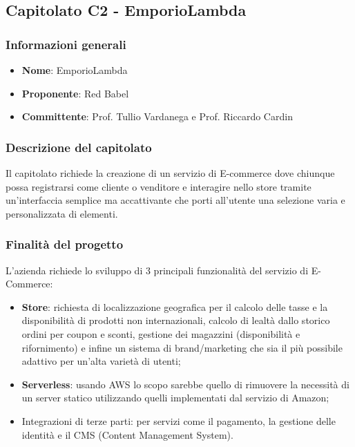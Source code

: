 	\subsection{Capitolato C2 - EmporioLambda}
		\subsubsection{Informazioni generali}
			\begin{itemize}
				\item\textbf{Nome}: EmporioLambda
				\item\textbf{Proponente}: Red Babel
				\item\textbf{Committente}: Prof. Tullio Vardanega e Prof. Riccardo Cardin
			\end{itemize}
			
		\subsubsection{Descrizione del capitolato}
			Il capitolato richiede la creazione di un servizio di E-commerce dove chiunque possa registrarsi come cliente o venditore e interagire nello store tramite un’interfaccia semplice ma accattivante che porti all’utente una selezione varia e personalizzata di elementi.
		\subsubsection{Finalità del progetto}
			L’azienda richiede lo sviluppo di 3 principali funzionalità del servizio di E-Commerce:
			\begin{itemize}
				\item\textbf{Store}: richiesta di localizzazione geografica per il calcolo delle tasse e la disponibilità di prodotti non internazionali, calcolo di lealtà dallo storico ordini per coupon e sconti, gestione dei magazzini (disponibilità e rifornimento) e infine un sistema di brand/marketing che sia il più possibile adattivo per un'alta varietà di utenti;
				\item\textbf{Serverless}: usando AWS lo scopo sarebbe quello di rimuovere la necessità di un server statico utilizzando quelli implementati dal servizio di Amazon;
				\item Integrazioni di terze parti: per servizi come il pagamento, la gestione delle identità e il CMS (Content Management System).
			\end{itemize}
